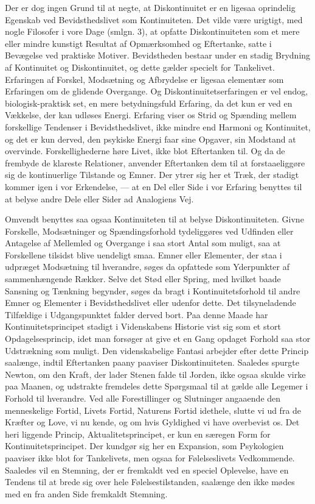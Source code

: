 \documentclass[12pt,a4paper]{book}
\newcommand{\apage}[1]{\marginnote{\footnotesize\textit{[#1]}}}
\begin{document}
Der er dog ingen Grund til at negte, at Diskontinuitet er en ligesaa
oprindelig Egenskab ved Bevidsthedslivet som Kontinuiteten. Det vilde være
urigtigt, med nogle Filosofer i vore Dage (smlgn. 3), at opfatte
Diskontinuiteten som et mere eller mindre kunstigt Resultat af Opmærksomhed
og Eftertanke, satte i Bevægelse ved praktiske Motiver. Bevidstheden bestaar
under en stadig Brydning af Kontinuitet og Diskontinuitet, og dette gælder
specielt for Tankelivet. Erfaringen af Forskel, Modsætning og Afbrydelse er
ligesaa elementær som Erfaringen om de glidende Overgange. Og
Diskontinuitetserfaringen er vel endog, biologisk-praktisk set, en mere
betydningsfuld Erfaring, da det kun er ved en Vækkelse, der kan udløses
Energi. Erfaring viser os Strid og Spænding mellem forskellige Tendenser i
Bevidsthedslivet, ikke mindre end Harmoni og Kontinuitet, og det er kun
derved, den psykiske Energi faar sine Opgaver, sin Modstand at overvinde.
Forskellighederne høre Livet, ikke blot Eftertanken til. Og da de frembyde
de klareste Relationer, anvender Eftertanken dem til at forstaaeliggøre sig
de kontinuerlige Tilstande og Emner. Der ytrer sig her et \apage{159} Træk, der stadigt
kommer igen i vor Erkendelse, --- at en Del eller Side i vor Erfaring
benyttes til at belyse andre Dele eller Sider ad Analogiens Vej.

Omvendt benyttes saa ogsaa Kontinuiteten til at belyse Diskontinuiteten.
Givne Forskelle, Modsætninger og Spændingsforhold tydeliggøres ved Udfinden
eller Antagelse af Mellemled og Overgange i saa stort Antal som muligt, saa
at Forskellene tilsidst blive uendeligt smaa. Emner eller Elementer, der staa
i udpræget Modsætning til hverandre, søges da opfattede som Yderpunkter af
sammenhængende Rækker. Selve det Stød eller Spring, med hvilket baade
Sansning og Tænkning begynder, søges da bragt i Kontinuitetsforhold til
andre Emner og Elementer i Bevidsthedslivet eller udenfor dette. Det
tilsyneladende Tilfældige i Udgangspunktet falder derved bort. Paa denne
Maade har Kontinuitetsprincipet stadigt i Videnskabens Historie vist sig som
et stort Opdagelsesprincip, idet man forsøger at give et en Gang opdaget
Forhold saa stor Udstrækning som muligt. Den videnskabelige Fantasi arbejder
efter dette Princip saalænge, indtil Eftertanken paany paaviser
Diskontinuiteten. Saaledes spurgte Newton, om den Kraft, der lader Stenen
falde til Jorden, ikke ogsaa skulde virke paa Maanen, og udstrakte fremdeles
dette Spørgsmaal til at gælde alle Legemer i Forhold til hverandre. Ved alle
Forestillinger og Slutninger angaaende den menneskelige Fortid, Livets
Fortid, Naturens Fortid idethele, slutte vi ud fra de Kræfter og Love, vi nu
kende, og om hvis Gyldighed vi have overbevist os. Det heri liggende Princip,
Aktualitetsprincipet, er kun en særegen Form for Kontinuitetsprincipet. Der
kundgør sig her en Expansion, som Psykologien paaviser ikke blot for
Tankelivets, men ogsaa for Følelseslivets Vedkommende. Saaledes vil en
Stemning, der er fremkaldt ved en speciel Oplevelse, have en Tendens til at
brede sig over hele Følelsestilstanden, saalænge den ikke mødes med en fra
anden Side fremkaldt Stemning.
\end{document}
